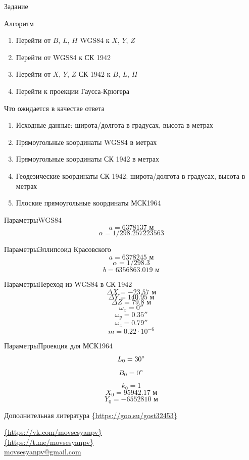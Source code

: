 \documentclass[aspectratio=43]{beamer}
\begin{document}
\begin{frame}
\center Задание
\end{frame}

\begin{frame}{Алгоритм}
\begin{enumerate}
\item Перейти от $B$, $L$, $H$ WGS84 к $X$, $Y$, $Z$
\item Перейти от WGS84 к СК 1942
\item Перейти от $X$, $Y$, $Z$ СК 1942 к $B$, $L$, $H$
\item Перейти к проекции Гаусса-Крюгера
\end{enumerate}
\end{frame}

\begin{frame}{Что ожидается в качестве ответа}
\begin{enumerate}
\item Исходные данные: широта/долгота в градусах, высота в метрах
\item Прямоугольные координаты WGS84 в метрах
\item Прямоугольные координаты СК 1942 в метрах
\item Геодезические координаты СК 1942: широта/долгота в градусах, высота в метрах
\item Плоские прямоугольные координаты МСК1964
\end{enumerate}
\end{frame}

\begin{frame}{Параметры}{WGS84}
$$a=6378137\mbox{ м}$$
$$\alpha=1/298.257223563$$
\end{frame}

\begin{frame}{Параметры}{Эллипсоид Красовского}
$$a=6378245\mbox{ м}$$
$$\alpha=1/298.3$$
$$b=6356863.019\mbox{ м}$$
\end{frame}

\begin{frame}{Параметры}{Переход из WGS84 в СК 1942}
$$\Delta X=-23.57\mbox{ м}$$
$$\Delta Y=140.95\mbox{ м}$$
$$\Delta Z=79.8\mbox{ м}$$
$$\omega_x=0''$$
$$\omega_y=0.35''$$
$$\omega_z=0.79''$$
$$m=0.22\cdot10^{-6}$$
\end{frame}

\begin{frame}{Параметры}{Проекция для МСК1964}
$$L_0=30\degree$$
$$B_0=0\degree$$
$$k_0=1$$
$$X_0=95942.17\mbox{ м}$$
$$Y_0=-6552810\mbox{ м}$$
\end{frame}

\begin{frame}{Дополнительная литература}
\center\url{{https://goo.su/gost32453}}
\end{frame}

\begin{frame}
\center\url{{https://vk.com/movsesyanpv}}\\
\url{{https://t.me/movsesyanpv}}\\
\href{mailto:movsesyanpv@gmail.com}{movsesyanpv@gmail.com}\\
\end{frame}
\end{document}
